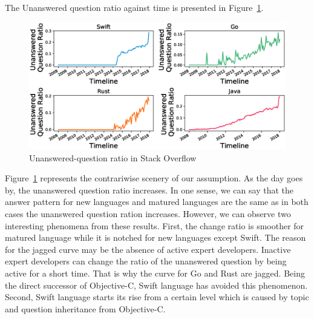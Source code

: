 The Unanswered question ratio against time is presented in Figure~\ref{fig:Unanswered-question ratio}.
\begin{figure}[htbp]
\centering
\includegraphics[scale=0.38]{figures/UnansweredQuestionRatio.eps}
\caption{Unanswered-question ratio in Stack Overflow}
\label{fig:Unanswered-question ratio}
\end{figure}


Figure~\ref{fig:Unanswered-question ratio} represents the contrariwise scenery of our assumption. As the day goes by, the unanswered question ratio increases. In one sense, we can say that the answer pattern for new languages and matured languages are the same as in both cases the unanswered question ration increases. However, we can observe two interesting phenomena from these results. First, the change ratio is smoother for matured language while it is notched for new languages except Swift. The reason for the jagged curve may be the absence of active expert developers. Inactive expert developers can change the ratio of the unanswered question by being active for a short time. That is why the curve for Go and Rust are jagged. Being the direct successor of Objective-C, Swift language has avoided this phenomenon. Second, Swift language starts its rise from a certain level which is caused by topic and question inheritance from Objective-C.

